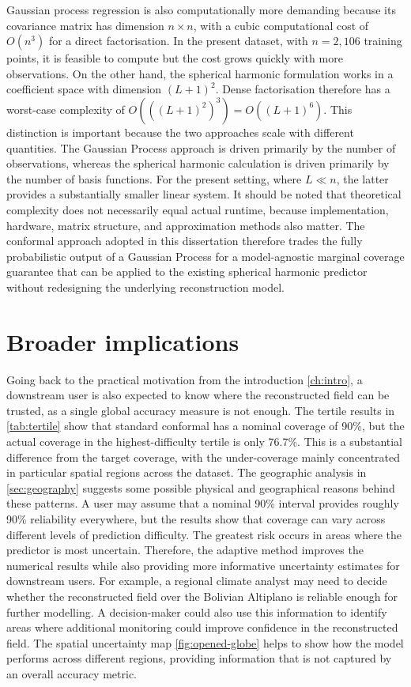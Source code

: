 Gaussian process regression is also computationally more demanding because its covariance matrix has dimension $n\times n$, with a cubic computational cost of $O(n^3)$ for a direct factorisation. In the present dataset, with $n=2{,}106$ training points, it is feasible to compute but the cost grows quickly with more observations. On the other hand, the spherical harmonic formulation works in a coefficient space with dimension $(L+1)^2$. Dense factorisation therefore has a worst-case complexity of $O(((L+1)^2)^3)=O((L+1)^6)$. This distinction is important because the two approaches scale with different quantities. The Gaussian Process approach is driven primarily by the number of observations, whereas the spherical harmonic calculation is driven primarily by the number of basis functions. For the present setting, where $L\ll n$, the latter provides a substantially smaller linear system. It should be noted that theoretical complexity does not necessarily equal actual runtime, because implementation, hardware, matrix structure, and approximation methods also matter. The conformal approach adopted in this dissertation therefore trades the fully probabilistic output of a Gaussian Process for a model-agnostic marginal coverage guarantee that can be applied to the existing spherical harmonic predictor without redesigning the underlying reconstruction model.

\section{Broader implications}

Going back to the practical motivation from the introduction \cref{ch:intro}, a downstream user is also expected to know where the reconstructed field can be trusted, as a single global accuracy measure is not enough. The tertile results in \cref{tab:tertile} show that standard conformal has a nominal coverage of 90\%, but the actual coverage in the highest-difficulty tertile is only 76.7\%. This is a substantial difference from the target coverage, with the under-coverage mainly concentrated in particular spatial regions across the dataset. The geographic analysis in \cref{sec:geography} suggests some possible physical and geographical reasons behind these patterns. A user may assume that a nominal 90\% interval provides roughly 90\% reliability everywhere, but the results show that coverage can vary across different levels of prediction difficulty. The greatest risk occurs in areas where the predictor is most uncertain. Therefore, the adaptive method improves the numerical results while also providing more informative uncertainty estimates for downstream users. For example, a regional climate analyst may need to decide whether the reconstructed field over the Bolivian Altiplano is reliable enough for further modelling. A decision-maker could also use this information to identify areas where additional monitoring could improve confidence in the reconstructed field. The spatial uncertainty map \cref{fig:opened-globe} helps to show how the model performs across different regions, providing information that is not captured by an overall accuracy metric.

